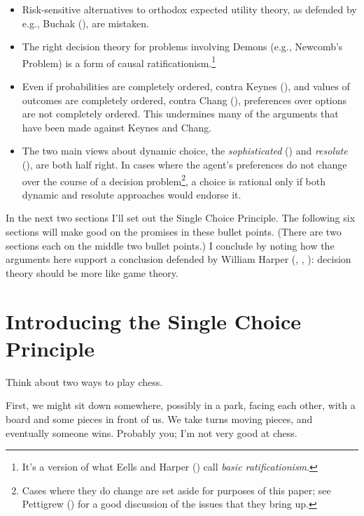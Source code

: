 \documentclass[
  11pt,
  letterpaper,
  DIV=11,
  numbers=noendperiod,
  twoside]{scrartcl}
\providecommand{\tightlist}{%
  \setlength{\itemsep}{0pt}\setlength{\parskip}{0pt}}
\begin{document}
\begin{itemize}
\tightlist
\item
  Risk-sensitive alternatives to orthodox expected utility theory, as
  defended by e.g., Buchak (), are
  mistaken.
\item
  The right decision theory for problems involving Demons (e.g.,
  Newcomb's Problem) is a form of causal ratificationism.\footnote{It's
    a version of what Eells and Harper
    () call \emph{basic
    ratificationism}.}
\item
  Even if probabilities are completely ordered, contra Keynes
  (), and values of outcomes are
  completely ordered, contra Chang (),
  preferences over options are not completely ordered. This undermines
  many of the arguments that have been made against Keynes and Chang.
\item
  The two main views about dynamic choice, the \emph{sophisticated}
  () and \emph{resolute}
  (), are both half right.
  In cases where the agent's preferences do not change over the course
  of a decision problem\footnote{Cases where they do change are set
    aside for purposes of this paper; see Pettigrew
    () for a good discussion of the
    issues that they bring up.}, a choice is rational only if both
  dynamic and resolute approaches would endorse it.
\end{itemize}

In the next two sections I'll set out the Single Choice Principle. The
following six sections will make good on the promises in these bullet
points. (There are two sections each on the middle two bullet points.) I
conclude by noting how the arguments here support a conclusion defended
by William Harper (,
, ):
decision theory should be more like game theory.

\section{Introducing the Single Choice Principle}\label{sec-scp-intro}

Think about two ways to play chess.

First, we might sit down somewhere, possibly in a park, facing each
other, with a board and some pieces in front of us. We take turns moving
pieces, and eventually someone wins. Probably you; I'm not very good at
chess.
\end{document}
